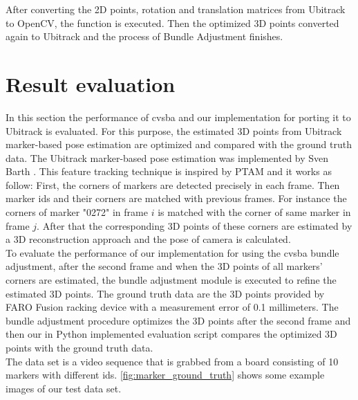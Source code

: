 After converting the 2D points, rotation and translation matrices from Ubitrack to OpenCV, the  function is executed. Then the optimized 3D points converted again to Ubitrack and the process of Bundle Adjustment finishes.\\

\section{Result evaluation}
In this section the performance of cvsba and our implementation for porting it to Ubitrack is evaluated. For this purpose, the estimated 3D points from Ubitrack marker-based pose estimation are optimized and compared with the ground truth data. The Ubitrack marker-based pose estimation was implemented by Sven Barth \cite{barth2014marker}. This feature tracking technique is inspired by PTAM \cite{klein2007parallel} and it works as follow: First, the corners of markers are detected precisely in each frame. Then marker ids and their corners are matched with previous frames. For instance the corners of marker "0272" in frame $i$ is matched with the corner of same marker in frame $j$. After that the corresponding 3D points of these corners are estimated by a 3D reconstruction approach and the pose of camera is calculated.\\
To evaluate the performance of our implementation for using the cvsba bundle adjustment, after the second frame and when the 3D points of all markers' corners are estimated, the bundle adjustment module is executed to refine the estimated 3D points. The ground truth data are the 3D points provided by FARO Fusion racking device with a measurement error of 0.1 millimeters. The bundle adjustment procedure optimizes the 3D points after the second frame and then our in Python implemented evaluation script compares the optimized 3D points with the ground truth data.\\
The data set is a video sequence that is grabbed from a board consisting of 10 markers with different ids. \autoref{fig:marker_ground_truth} shows some example images of our test data set.
